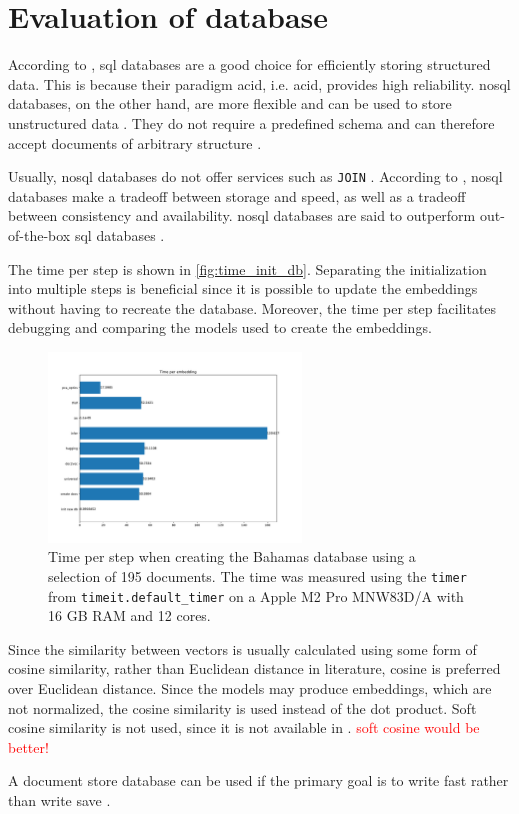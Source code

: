 \section{Evaluation of database}\label{subsec:evaluation-db}

According to \cite{flask_book2018}, \ac{sql} databases are a good choice for efficiently storing structured data.
This is because their paradigm \acs{acid}, i.e. \acl{acid}, provides high reliability.
\ac{nosql} databases, on the other hand, are more flexible and can be used to store unstructured data \cite{flask_book2018}.
They do not require a predefined schema and can therefore accept documents of arbitrary structure \cite{flask2018}.

Usually, \ac{nosql} databases do not offer services such as \texttt{JOIN} \cite{flask2018}.
According to \citeauthor{flask2018}, \ac{nosql} databases make a tradeoff between storage and speed, as well as a tradeoff between consistency and availability.
\ac{nosql} databases are said to outperform out-of-the-box \ac{sql} databases \cite{flask2018}.

The time per step is shown in \autoref{fig:time_init_db}.
Separating the initialization into multiple steps is beneficial since it is possible to update the embeddings without having to recreate the database.
Moreover, the time per step facilitates debugging and comparing the models used to create the embeddings.

\begin{figure}[htp] %
    \centering
    \includegraphics[width=0.6\textwidth]{images/Elasticsearch/time_per_emb.pdf}
    \caption{Time per step when creating the Bahamas database using a selection of 195 documents.
    The time was measured using the \texttt{timer} from \texttt{timeit.default\_timer} on a Apple M2 Pro MNW83D/A with 16 GB RAM and 12 cores.
    }
    \label{fig:time_init_db}
\end{figure}

Since the similarity between vectors is usually calculated using some form of cosine similarity, 
rather than Euclidean distance in literature, cosine is preferred over Euclidean distance. 
Since the models may produce embeddings, which are not normalized, the cosine similarity is used instead of the dot product.
Soft cosine similarity is not used, since it is not available in \databaseName{}.
\textcolor{red}{soft cosine would be better!}

A document store database can be used if the primary goal is to write fast rather than write save \cite{flask2018}.